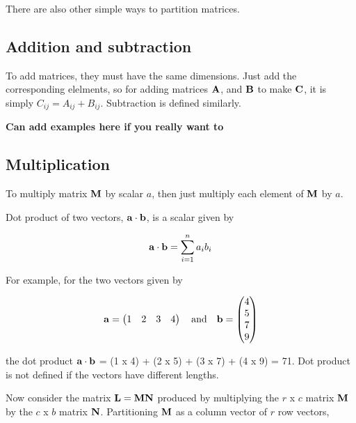 \documentclass[
]{book}
\begin{document}
There are also other simple ways to partition matrices.

\hypertarget{addition-and-subtraction}{%
\subsection{Addition and subtraction}\label{addition-and-subtraction}}

To add matrices, they must have the same dimensions. Just add the corresponding elelments, so for adding matrices \(\mathbf{A}\), and \(\mathbf{B}\) to make \(\mathbf{C}\), it is simply \(C_{ij} = A_{ij} + B_{ij}\). Subtraction is defined similarly.

\textbf{Can add examples here if you really want to}

\hypertarget{multiplication}{%
\subsection{Multiplication}\label{multiplication}}

To multiply matrix \(\mathbf{M}\) by scalar \(a\), then just multiply each element of \(\mathbf{M}\) by \(a\).

Dot product of two vectors, \(\mathbf{a} \cdot \mathbf{b}\), is a scalar given by

\begin{equation}
    \mathbf{a} \cdot \mathbf{b} = \sum^n_{i=1} {a_ib_i} \notag
\end{equation}

For example, for the two vectors given by

\begin{equation}
    \mx{a} = 
    \begin{pmatrix}
        1 & 2 & 3 & 4
    \end{pmatrix} 
\ \ \ \mathrm{and} \ \ \ 
    \mx{b} = 
    \begin{pmatrix}
        4 \\
        5 \\
        7 \\
        9
    \end{pmatrix}
    \notag
\end{equation}

the dot product \(\mathbf{a} \cdot \mathbf{b}\) = (1 x 4) + (2 x 5) + (3 x 7) + (4 x 9) = 71. Dot product is not defined if the vectors have different lengths.

Now consider the matrix \(\mathbf{L} = \mathbf{M}\mathbf{N}\) produced by multiplying the \(r\) x \(c\) matrix \(\mathbf{M}\) by the \(c\) x \(b\) matrix \(\mathbf{N}\). Partitioning \(\mathbf{M}\) as a column vector of \(r\) row vectors,
\end{document}
